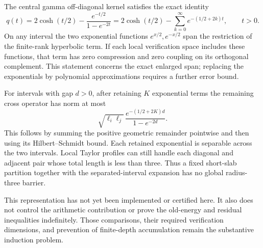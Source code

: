 The central gamma off-diagonal kernel satisfies the exact identity
\[
 q(t)=2\cosh(t/2)
       -\frac{e^{-t/2}}{1-e^{-2t}}
     =2\cosh(t/2)-\sum_{k=0}^{\infty}e^{-(1/2+2k)t},
 \qquad t>0.
\]
On any interval the two exponential functions \(e^{x/2},e^{-x/2}\)
span the restriction of the finite-rank hyperbolic term. If each local
verification space includes these functions, that term has zero compression
and zero coupling on its orthogonal complement. This statement concerns
the exact enlarged span; replacing the exponentials by polynomial
approximations requires a further error bound.

For intervals with gap \(d>0\), after retaining \(K\) exponential terms the
remaining cross operator has norm at most
\[
 \sqrt{\ell_i\ell_j}\,
 \frac{e^{-(1/2+2K)d}}{1-e^{-2d}}.
\]
This follows by summing the positive geometric remainder pointwise and then
using its Hilbert--Schmidt bound. Each retained exponential is separable
across the two intervals. Local Taylor profiles can still handle each
diagonal and adjacent pair whose total length is less than three.
Thus a fixed short-slab partition together with the separated-interval
expansion has no global radius-three barrier.

This representation has not yet been implemented or certified here.
It also does not control the arithmetic contribution or prove the
old-energy and residual inequalities indefinitely. Those comparisons,
their required verification dimensions, and prevention of finite-depth
accumulation remain the substantive induction problem.
